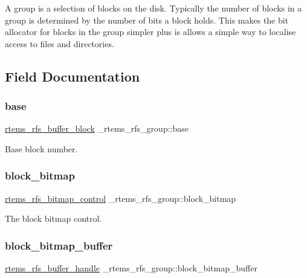 A group is a selection of blocks on the disk. Typically the number of blocks in a group is determined by the number of bits a block holds. This makes the bit allocator for blocks in the group simpler plus is allows a simple way to localise access to files and directories. 

\subsection{Field Documentation}
\mbox{\label{struct__rtems__rfs__group_a26f3266e790c5571decaab6af52b1b51}} 
\subsubsection{\texorpdfstring{base}{base}}
{\footnotesize\ttfamily \mbox{\hyperlink{rtems-rfs-buffer_8h_a5650d53328a5af0a78198fe780aec043}{rtems\+\_\+rfs\+\_\+buffer\+\_\+block}} \+\_\+rtems\+\_\+rfs\+\_\+group\+::base}

Base block number. \mbox{\label{struct__rtems__rfs__group_ad0c918a6d5fc64b98de1644fcd5ef981}} 
\subsubsection{\texorpdfstring{block\_bitmap}{block\_bitmap}}
{\footnotesize\ttfamily \mbox{\hyperlink{rtems-rfs-bitmaps_8h_aa1b1de5abc294444428eb1038d7f898b}{rtems\+\_\+rfs\+\_\+bitmap\+\_\+control}} \+\_\+rtems\+\_\+rfs\+\_\+group\+::block\+\_\+bitmap}

The block bitmap control. \mbox{\label{struct__rtems__rfs__group_ab74711fa5650c09b0f6f2ccc2beee2c3}} 
\subsubsection{\texorpdfstring{block\_bitmap\_buffer}{block\_bitmap\_buffer}}
{\footnotesize\ttfamily \mbox{\hyperlink{rtems-rfs-buffer_8h_a17f97c37c5273ad28d413dfd2d175e23}{rtems\+\_\+rfs\+\_\+buffer\+\_\+handle}} \+\_\+rtems\+\_\+rfs\+\_\+group\+::block\+\_\+bitmap\+\_\+buffer}


